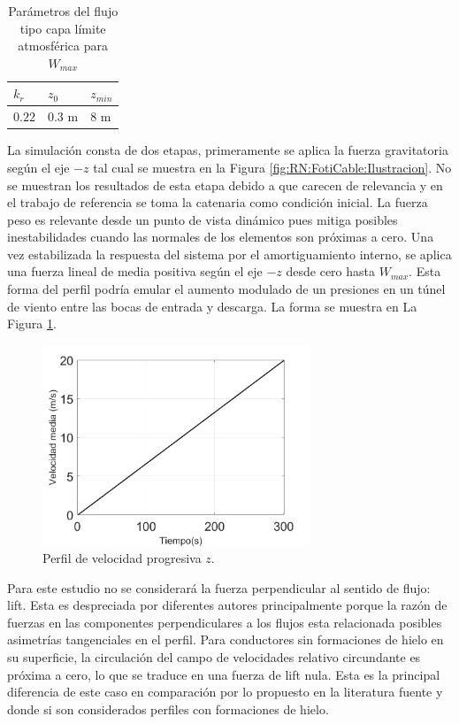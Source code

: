\begin{table}[htbp]\label{table:RN:propiedadesFlujo}
	\begin{center}
		\begin{tabular}{ | m{2cm} | m{2cm} | m{2cm} | }
			\hline $k_r$ & $z_0$& $z_{min}$  \\ \hline
			$0.22$ &$0.3$ m & $8$ m     \\ \hline
		\end{tabular}
	\end{center}
	\caption{Parámetros del flujo tipo capa límite atmosférica para $W_{max}$ }
\end{table}

La simulación consta de dos etapas, primeramente se aplica la fuerza gravitatoria según el eje $-z$ tal cual se muestra en la Figura \ref{fig:RN:FotiCable:Ilustracion}. No se muestran los resultados de esta etapa debido a que carecen de relevancia y en el trabajo de referencia se toma la catenaria como condición inicial. La fuerza peso es relevante desde un punto de vista dinámico pues mitiga posibles inestabilidades cuando las normales de los elementos son próximas a cero. Una vez estabilizada la respuesta del sistema por el amortiguamiento interno, se aplica una fuerza lineal de media positiva según el eje $-z$ desde cero hasta $W_{max}$. Esta forma del perfil podría emular el aumento modulado de un presiones en un túnel de viento entre las bocas de entrada y descarga. La forma se muestra en La Figura \ref{fig:RN:FotiCable:VelocidadCable}.
\begin{figure}[ht!]
	\centering
	\includegraphics[width=80mm]{./imagenes/ResultadosNumericos/SimpleCable/PerfilVm_TL_Foti.png}
	\caption{Perfil de velocidad progresiva $z$.}
	\label{fig:RN:FotiCable:VelocidadCable}
\end{figure}

Para este estudio no se considerará la fuerza perpendicular al sentido de flujo: lift. Esta es despreciada por diferentes autores \citep{lee1992nonlinear} \citep{Foti2016} \citep{Papailiou1997} principalmente porque la razón de fuerzas en las componentes perpendiculares a los flujos esta relacionada posibles asimetrías tangenciales en el perfil. Para conductores sin formaciones de hielo en su superficie, la circulación del campo de velocidades relativo circundante es próxima a cero, lo que se traduce en una fuerza de lift nula. Esta es la principal diferencia de este caso en comparación por lo propuesto en la literatura fuente \citep{luongo1984planar} y \citep{foti2018finite} donde si son considerados perfiles con formaciones de hielo.


